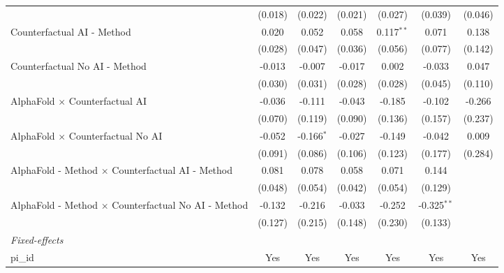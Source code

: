 \begin{tabular}{lcccccc}
                                                              & (0.018)      & (0.022)       & (0.021)      & (0.027)       & (0.039)       & (0.046)\\   
   Counterfactual AI - Method                                 & 0.020        & 0.052         & 0.058        & 0.117$^{**}$  & 0.071         & 0.138\\   
                                                              & (0.028)      & (0.047)       & (0.036)      & (0.056)       & (0.077)       & (0.142)\\   
   Counterfactual No AI - Method                              & -0.013       & -0.007        & -0.017       & 0.002         & -0.033        & 0.047\\   
                                                              & (0.030)      & (0.031)       & (0.028)      & (0.028)       & (0.045)       & (0.110)\\   
   AlphaFold $\times$ Counterfactual AI                       & -0.036       & -0.111        & -0.043       & -0.185        & -0.102        & -0.266\\   
                                                              & (0.070)      & (0.119)       & (0.090)      & (0.136)       & (0.157)       & (0.237)\\   
   AlphaFold $\times$ Counterfactual No AI                    & -0.052       & -0.166$^{*}$  & -0.027       & -0.149        & -0.042        & 0.009\\   
                                                              & (0.091)      & (0.086)       & (0.106)      & (0.123)       & (0.177)       & (0.284)\\   
   AlphaFold - Method $\times$ Counterfactual AI - Method     & 0.081        & 0.078         & 0.058        & 0.071         & 0.144         &   \\   
                                                              & (0.048)      & (0.054)       & (0.042)      & (0.054)       & (0.129)       &   \\   
   AlphaFold - Method $\times$ Counterfactual No AI - Method  & -0.132       & -0.216        & -0.033       & -0.252        & -0.325$^{**}$ &   \\   
                                                              & (0.127)      & (0.215)       & (0.148)      & (0.230)       & (0.133)       &   \\   
   \midrule
   \emph{Fixed-effects}\\
   pi\_id                                                     & Yes          & Yes           & Yes          & Yes           & Yes           & Yes\\  

\end{tabular}
